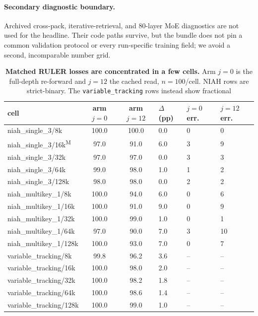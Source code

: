 \FloatBarrier

\paragraph{Secondary diagnostic boundary.}
Archived cross-pack, iterative-retrieval, and 80-layer MoE diagnostics are not
used for the headline.  Their code paths survive, but the bundle does not pin a
common validation protocol or every run-specific training field; we avoid a
second, incomparable number grid.

\begin{table}[htbp]
\centering
\small
\begin{tabular}{@{}lcclll@{}}
\toprule
\textbf{cell} & \textbf{arm $j{=}0$} & \textbf{arm $j{=}12$} &
$\Delta$ (pp) & $j{=}0$ err. & $j{=}12$ err. \\
\midrule
niah\_single\_3/8k   & 100.0 & 100.0 & 0.0 & 0 & 0 \\
niah\_single\_3/16k\textsuperscript{M} & 97.0 & 91.0 & 6.0 & 3 & 9 \\
niah\_single\_3/32k  & 97.0 & 97.0 & 0.0 & 3 & 3 \\
niah\_single\_3/64k  & 99.0 & 98.0 & 1.0 & 1 & 2 \\
niah\_single\_3/128k & 98.0 & 98.0 & 0.0 & 2 & 2 \\
niah\_multikey\_1/8k   & 100.0 & 94.0 & 6.0 & 0 & 6 \\
niah\_multikey\_1/16k  & 100.0 & 91.0 & 9.0 & 0 & 9 \\
niah\_multikey\_1/32k  & 100.0 & 99.0 & 1.0 & 0 & 1 \\
niah\_multikey\_1/64k  & 97.0 & 90.0 & 7.0 & 3 & 10 \\
niah\_multikey\_1/128k & 100.0 & 93.0 & 7.0 & 0 & 7 \\
variable\_tracking/8k   & 99.8 & 96.2 & 3.6 & -- & -- \\
variable\_tracking/16k  & 100.0 & 98.0 & 2.0 & -- & -- \\
variable\_tracking/32k  & 100.0 & 98.2 & 1.8 & -- & -- \\
variable\_tracking/64k  & 100.0 & 98.6 & 1.4 & -- & -- \\
variable\_tracking/128k & 100.0 & 99.0 & 1.0 & -- & -- \\
\bottomrule
\end{tabular}
\caption{\textbf{Matched RULER losses are concentrated in a few cells.}
Arm $j=0$ is the full-depth re-forward and $j=12$ the cached read,
$n=100$/cell.  NIAH rows are strict-binary.  The
\texttt{variable\_tracking} rows instead show fractional
}
\end{table}
